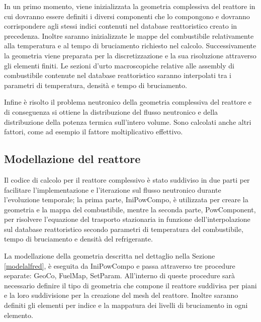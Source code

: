 In un primo momento, viene inizializzata la geometria complessiva del reattore 
in cui dovranno essere definiti i diversi componenti che lo compongono e 
dovranno corrispondere agli stessi indici contenuti nel database reattoristico 
creato in precedenza.
Inoltre saranno inizializzate le mappe del combustibile relativamente alla 
temperatura e al tempo di bruciamento richiesto nel calcolo.
Successivamente la geometria viene preparata per la discretizzazione e la sua 
risoluzione attraverso gli elementi finiti.
Le sezioni d'urto macroscopiche relative alle assembly di combustibile 
contenute 
nel database reattoristico saranno interpolati tra i parametri di temperatura, 
densità e tempo di bruciamento.

Infine è risolto il problema neutronico della geometria complessiva del 
reattore 
e di conseguenza si ottiene la distribuzione del flusso neutronico e della 
distribuzione della potenza termica sull'intero volume. Sono calcolati anche 
altri fattori, come ad esempio il fattore moltiplicativo effettivo.

\subsection{Modellazione del reattore}

Il codice di calcolo per il reattore complessivo è stato suddiviso in due parti 
per facilitare l'implementazione e l'iterazione sul flusso neutronico durante 
l'evoluzione temporale; la prima parte, IniPowCompo, è utilizzata per creare la geometria e la 
mappa del combustibile, mentre la seconda parte, PowComponent, per risolvere l'equazione del 
trasporto stazionaria in funzione dell'interpolazione sul database 
reattoristico 
secondo parametri di temperatura del combustibile, tempo di bruciamento e 
densità del refrigerante.


La modellazione della geometria descritta nel dettaglio 
nella Sezione \ref{modelalfred}, è eseguita da IniPowCompo e passa
attraverso tre procedure separate: GeoCo, FuelMap, SetParam. 
All'interno di queste procedure sarà necessario definire il tipo di
geometria che compone il reattore suddivisa per piani e la loro 
suddivisione per la creazione del mesh del reattore. 
Inoltre saranno definiti gli elementi per indice e la mappatura dei 
livelli di bruciamento in ogni elemento.


